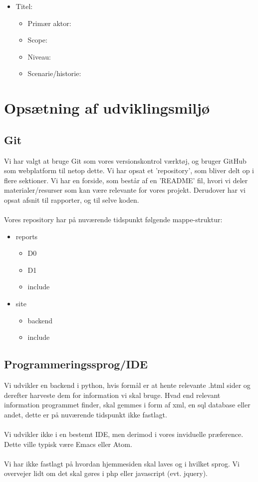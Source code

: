 \documentclass[11pt]{article}
\begin{document}
\begin{itemize}
\item Titel:
  \begin{itemize}
  \item Primær aktor:
  \item Scope:
  \item Niveau:
  \item Scenarie/historie:
  \end{itemize}
\end{itemize}
\section{Opsætning af udviklingsmiljø}
\subsection{Git}
Vi har valgt at bruge Git som vores versionskontrol værktøj, og bruger GitHub som webplatform til netop dette.
Vi har opsat et 'repository', som bliver delt op i flere sektioner. Vi har en forside, som består af en 'README' fil, hvori vi deler materialer/resurser som kan være relevante for vores projekt.
Derudover har vi opsat afsnit til rapporter, og til selve koden. \\ \\
Vores repository har på nuværende tidspunkt følgende mappe-struktur:
\begin{itemize}
\item reports
  \begin{itemize}
  \item D0
  \item D1
  \item include
  \end{itemize}
\item site
  \begin{itemize}
  \item backend
  \item include
  \end{itemize}
\end{itemize}
\subsection{Programmeringssprog/IDE}
Vi udvikler en backend i python, hvis formål er at hente relevante .html sider og derefter harveste dem for information vi skal bruge. Hvad end relevant information programmet finder, skal gemmes i form af xml, en sql database eller andet, dette er på nuværende tidspunkt ikke fastlagt. \\ \\
Vi udvikler ikke i en bestemt IDE, men derimod i vores inviduelle præference. Dette ville typisk være Emacs eller Atom. \\ \\
Vi har ikke fastlagt på hvordan hjemmesiden skal laves og i hvilket sprog. Vi overvejer lidt om det skal gøres i php eller javascript (evt. jquery).
\end{document}
